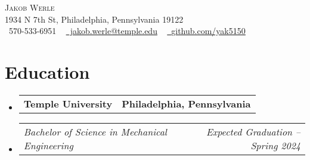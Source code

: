 \documentclass[letterpaper,11pt]{article}
\makeatletter
\newcommand{\company}[2]{
  \vspace{-2pt}\item
    \begin{tabular*}{1.0\textwidth}[t]{l@{\extracolsep{\fill}}r}
      \textbf{#1} & \textbf{\small #2} \\
    \end{tabular*}\vspace{-18pt}
}
\newcommand{\role}[2]{
  \vspace{-5pt}\item
    \begin{tabular*}{1.0\textwidth}[t]{l@{\extracolsep{\fill}}r}
      \textit{\small#1} & \textit{\small #2} \\
    \end{tabular*}\vspace{-7pt}
}
\newcommand{\companyListStart}{\begin{itemize}[leftmargin=0.0in, label={}]}
\newcommand{\companyListEnd}{\end{itemize}}
\makeatother
\begin{document}

\begin{center}
    {\Huge \scshape Jakob Werle} \\ \vspace{1pt}
    1934 N 7th St, Philadelphia, Pennsylvania 19122 \\ \vspace{1pt}
    \small \raisebox{-0.1\height}\faPhone\ 570-533-6951 ~ \href{mailto:jakob.werle@temple.edu}{\raisebox{-0.2\height}\faEnvelope\ jakob.werle@temple.edu} ~ 
    \href{https://github.com/yak5150}{\raisebox{-0.2\height}\faGithub\ \underline{github.com/yak5150}}
    \vspace{-8pt}
\end{center}

\section{Education}
  \companyListStart
    \company{Temple University}{Philadelphia, Pennsylvania}
      \role{Bachelor of Science in Mechanical Engineering}{Expected Graduation -- Spring 2024}
  \companyListEnd

\end{document}
